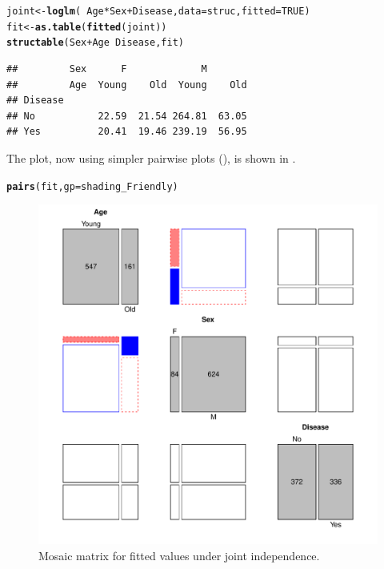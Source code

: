 \documentclass[11pt]{book}\usepackage[]{graphicx}\usepackage[]{color}
\makeatletter
\newcommand{\hlnum}[1]{\textcolor[rgb]{0.686,0.059,0.569}{#1}}%
\newcommand{\hlopt}[1]{\textcolor[rgb]{0,0,0}{#1}}%
\newcommand{\hlstd}[1]{\textcolor[rgb]{0.345,0.345,0.345}{#1}}%
\newcommand{\hlkwb}[1]{\textcolor[rgb]{0.69,0.353,0.396}{#1}}%
\newcommand{\hlkwc}[1]{\textcolor[rgb]{0.333,0.667,0.333}{#1}}%
\newcommand{\hlkwd}[1]{\textcolor[rgb]{0.737,0.353,0.396}{\textbf{#1}}}%
\newenvironment{kframe}{%
 \def\at@end@of@kframe{}%
 \ifinner\ifhmode%
  \def\at@end@of@kframe{\end{minipage}}%
  \begin{minipage}{\columnwidth}%
 \fi\fi%
 \def\FrameCommand##1{\hskip\@totalleftmargin \hskip-\fboxsep
 \colorbox{shadecolor}{##1}\hskip-\fboxsep
     \hskip-\linewidth \hskip-\@totalleftmargin \hskip\columnwidth}%
 \MakeFramed {\advance\hsize-\width
   \@totalleftmargin\z@ \linewidth\hsize
   \@setminipage}}%
 {\par\unskip\endMakeFramed%
 \at@end@of@kframe}
\newenvironment{knitrout}{}{} %
\renewenvironment{knitrout}{\small\renewcommand{\baselinestretch}{.85}}{} %
\makeatother
\begin{document}
\begin{knitrout}
\color{fgcolor}\begin{kframe}
\begin{alltt}
\hlstd{joint} \hlkwb{<-} \hlkwd{loglm}\hlstd{(}\hlopt{~}\hlstd{Age}\hlopt{*}\hlstd{Sex} \hlopt{+} \hlstd{Disease,} \hlkwc{data}\hlstd{=struc,} \hlkwc{fitted}\hlstd{=}\hlnum{TRUE}\hlstd{)}
\hlstd{fit} \hlkwb{<-} \hlkwd{as.table}\hlstd{(}\hlkwd{fitted}\hlstd{(joint))}
\hlkwd{structable}\hlstd{(Sex}\hlopt{+}\hlstd{Age} \hlopt{~} \hlstd{Disease, fit)}
\end{alltt}
\begin{verbatim}
##         Sex      F             M       
##         Age  Young    Old  Young    Old
## Disease                                
## No           22.59  21.54 264.81  63.05
## Yes          20.41  19.46 239.19  56.95
\end{verbatim}
\end{kframe}
\end{knitrout}


The  plot, now using simpler pairwise plots (),
is shown in .
\begin{knitrout}
\color{fgcolor}\begin{kframe}
\begin{alltt}
\hlkwd{pairs}\hlstd{(fit,} \hlkwc{gp}\hlstd{=shading_Friendly)}
\end{alltt}
\end{kframe}\begin{figure}[!htb]


\centerline{\includegraphics[width=.8\textwidth]{ch05/fig/struc-mos4} }

\caption[Mosaic matrix for fitted values under joint independence]{Mosaic matrix for fitted values under joint independence.\label{fig:struc-mos4}}
\end{figure}


\end{knitrout}
\end{document}
